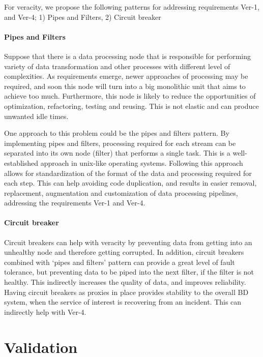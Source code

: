 \documentclass[a4paper,11pt,article,oneside]{memoir}
\begin{document}
For veracity, we propose the following patterns for addressing requirements Ver-1, and Ver-4; 1) Pipes and Filters, 2) Circuit breaker 

\subsubsection{Pipes and Filters}

Suppose that there is a data processing node that is responsible for performing variety of data transformation and other processes with different level of complexities. As requirements emerge, newer approaches of processing may be required, and soon this node will turn into a big monolithic unit that aims to achieve too much. Furthermore, this node is likely to reduce the opportunities of optimization, refactoring, testing and reusing. This is not elastic and can produce unwanted idle times. 

One approach to this problem could be the pipes and filters pattern. By implementing pipes and filters, processing required for each stream can be separated into its own node (filter) that performs a single task. This is a well-established approach in unix-like operating systems. Following this approach allows for standardization of the format of the data and processing required for each step. This can help avoiding code duplication, and results in easier removal, replacement, augmentation and customization of data processing pipelines, addressing the requirements Ver-1 and Ver-4.

\subsubsection{Circuit breaker}
 
 Circuit breakers can help with veracity by preventing data from getting into an unhealthy node and therefore getting corrupted. In addition, circuit breakers combined with `pipes and filters' pattern can provide a great level of fault tolerance, but preventing data to be piped into the next filter, if the filter is not healthy. This indirectly increases the quality of data, and improves reliability. Having circuit breakers as proxies in place provides stability to the overall BD system, when the service of interest is recovering from an incident. This can indirectly help with Ver-4.


\chapter{Validation}
\end{document}

